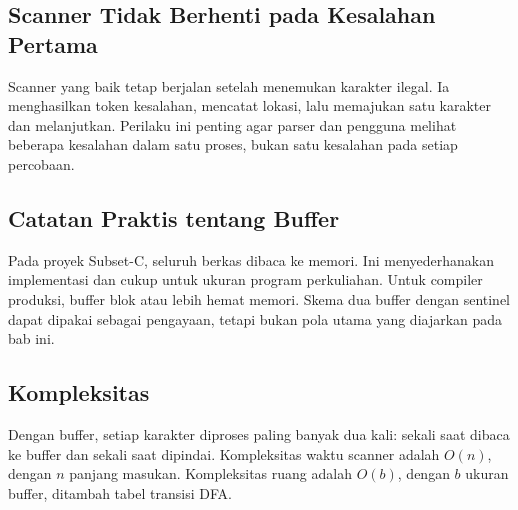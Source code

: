 \subsection{Scanner Tidak Berhenti pada Kesalahan Pertama}

Scanner yang baik tetap berjalan setelah menemukan karakter ilegal.
Ia menghasilkan token kesalahan, mencatat lokasi, lalu memajukan
 satu karakter dan melanjutkan. Perilaku ini penting
agar parser dan pengguna melihat beberapa kesalahan dalam satu
proses, bukan satu kesalahan pada setiap percobaan.

\subsection{Catatan Praktis tentang Buffer}

Pada proyek Subset-C, seluruh berkas dibaca ke memori. Ini
menyederhanakan implementasi dan cukup untuk ukuran program
perkuliahan. Untuk compiler produksi, buffer blok atau
 lebih hemat memori. Skema dua buffer dengan
sentinel dapat dipakai sebagai pengayaan, tetapi bukan pola utama
yang diajarkan pada bab ini.

\subsection{Kompleksitas}

Dengan buffer, setiap karakter diproses paling banyak dua kali:
sekali saat dibaca ke buffer dan sekali saat dipindai. Kompleksitas
waktu scanner adalah \(O(n)\), dengan \(n\) panjang masukan.
Kompleksitas ruang adalah \(O(b)\), dengan \(b\) ukuran buffer,
ditambah tabel transisi DFA.
